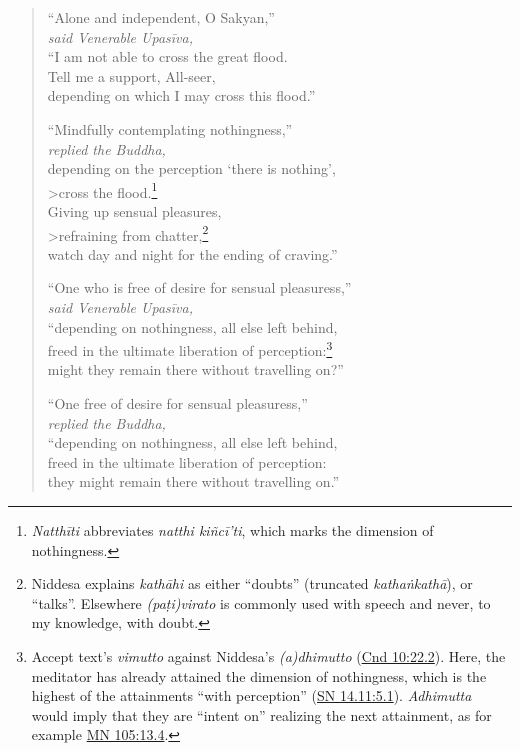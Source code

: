 \documentclass[12pt,openany]{book}%
\newcommand*{\scspeaker}[1]{\hspace{2em}\textit{#1}}
\begin{document}
\begin{verse}%
“Alone and independent, O Sakyan,” \\
\scspeaker{said Venerable \textsanskrit{Upasīva}, }\\
“I am not able to cross the great flood. \\
Tell me a support, All-seer, \\
depending on which I may cross this flood.” 

“Mindfully contemplating nothingness,” \\
\scspeaker{replied the Buddha, }\\
depending on the perception ‘there is nothing’, \\>cross the flood.\footnote{\textit{\textsanskrit{Natthīti}} abbreviates \textit{natthi \textsanskrit{kiñcī}’ti}, which marks the dimension of nothingness. } \\
Giving up sensual pleasures, \\>refraining from chatter,\footnote{Niddesa explains \textit{\textsanskrit{kathāhi}} as either “doubts” (truncated \textit{\textsanskrit{kathaṅkathā}}), or “talks”. Elsewhere \textit{(\textsanskrit{paṭi})virato} is commonly used with speech and never, to my knowledge, with doubt. } \\
watch day and night for the ending of craving.” 

“One who is free of desire for sensual pleasuress,” \\
\scspeaker{said Venerable \textsanskrit{Upasīva}, }\\
“depending on nothingness, all else left behind, \\
freed in the ultimate liberation of perception:\footnote{Accept text’s \textit{vimutto} against Niddesa’s \textit{(a)dhimutto} (\href{https://suttacentral.net/cnd10/en/sujato\#22.2}{Cnd 10:22.2}). Here, the meditator has already attained the dimension of nothingness, which is the highest of the attainments “with perception” (\href{https://suttacentral.net/sn14.11/en/sujato\#5.1}{SN 14.11:5.1}). \textit{Adhimutta} would imply that they are “intent on” realizing the next attainment, as for example \href{https://suttacentral.net/mn105/en/sujato\#13.4}{MN 105:13.4}. } \\
might they remain there without travelling on?” 

“One free of desire for sensual pleasuress,” \\
\scspeaker{replied the Buddha, }\\
“depending on nothingness, all else left behind, \\
freed in the ultimate liberation of perception: \\
they might remain there without travelling on.” 


\end{verse}
\end{document}
